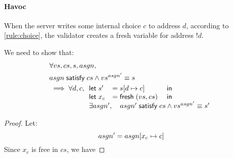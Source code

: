 \paragraph{Havoc}
When the server writes some internal choice $c$ to address $d$,
according to \autoref{rule:choice}, the validator creates a fresh variable for
address $!d$.

We need to show that:
\begin{align*}&\forall vs,cs,s,asgn,\\
&\satisfy{asgn}{cs}\wedge vs^{asgn'}\equiv s\\
&\implies\forall d,c,\begin{array}[t]{lll}
\letin{s'&}{\update{s}{d}{c}&}\\
\letin{x_c&}{\Fresh(vs,cs)&}\\
\multicolumn{3}{l}{\exists asgn',\quad\satisfy{asgn'} cs\wedge vs^{asgn'}\equiv s'}
\end{array}
\end{align*}
\begin{proof}
Let:\[asgn'=asgn[x_c\mapsto c]\]
Since $x_c$ is free in $cs$, we have
\end{proof}





